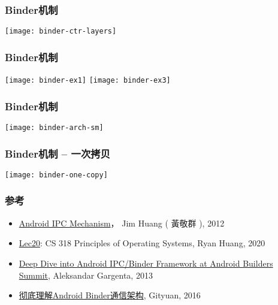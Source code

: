 \begin{frame}[plain]
	\frametitle{Binder机制}
	\centering
	\texttt{[image: binder-ctr-layers]}
	
\end{frame}

\begin{frame}[plain]
	\frametitle{Binder机制}
	\centering
	
\texttt{[image: binder-ex1]}
\texttt{[image: binder-ex3]}
	
\end{frame}

\begin{frame}[plain]
	\frametitle{Binder机制 }
	
	\texttt{[image: binder-arch-sm]}
	
\end{frame}
\begin{frame}[plain]
	\frametitle{Binder机制 -- 一次拷贝}

	\texttt{[image: binder-one-copy]}

\end{frame}

\begin{frame}[plain]
	\frametitle{参考}
	
			\begin{itemize}
				\item \href{http://www.dre.vanderbilt.edu/~schmidt/cs282/PDFs/android-binder-ipc.pdf}{Android IPC Mechanism}， Jim Huang ( 黃敬群 ), 2012
				\item \href{https://www.cs.jhu.edu/~huang/cs318/fall18/lectures/lec20_mobile_ds.pdf}{Lec20}: CS 318 Principles of Operating Systems, Ryan Huang, 2020			
				\item \href{https://events.static.linuxfound.org/images/stories/slides/abs2013_gargentas.pdf}{Deep Dive into Android IPC/Binder Framework at Android Builders Summit}, Aleksandar Gargenta, 2013				
				\item \href{http://gityuan.com/2016/09/04/binder-start-service/}{彻底理解Android Binder通信架构}, Gityuan, 2016
			\end{itemize}
	
\end{frame}

